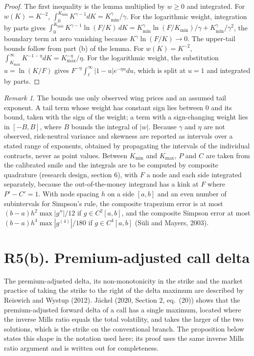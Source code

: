 \documentclass[11pt]{article}
\theoremstyle{remark}
\newtheorem{remark}[proposition]{Remark}
\begin{document}
\begin{proof}
The first inequality is the lemma multiplied by $w\ge0$ and integrated. For $w(K)=K^{-2}$, $\int_0^{K_{\min}}K^{\gamma-1}dK=K_{\min}^\gamma/\gamma$. For the logarithmic weight, integration by parts gives $\int_0^{K_{\min}}K^{\gamma-1}\ln(F/K)\,dK=K_{\min}^\gamma\ln(F/K_{\min})/\gamma+K_{\min}^\gamma/\gamma^2$, the boundary term at zero vanishing because $K^\gamma\ln(F/K)\to0$. The upper-tail bounds follow from part (b) of the lemma. For $w(K)=K^{-2}$, $\int_{K_{\max}}^\infty K^{-1-\eta}dK=K_{\max}^{-\eta}/\eta$. For the logarithmic weight, the substitution $u=\ln(K/F)$ gives $F^{-\eta}\int_\ell^\infty|1-u|e^{-\eta u}du$, which is split at $u=1$ and integrated by parts.
\end{proof}

\begin{remark}
The bounds use only observed wing prices and an assumed tail exponent. A tail term whose weight has constant sign lies between $0$ and its bound, taken with the sign of the weight; a term with a sign-changing weight lies in $[-B,B]$, where $B$ bounds the integral of $|w|$. Because $\gamma$ and $\eta$ are not observed, risk-neutral variance and skewness are reported as intervals over a stated range of exponents, obtained by propagating the intervals of the individual contracts, never as point values. Between $K_{\min}$ and $K_{\max}$, $P$ and $C$ are taken from the calibrated smile and the integrals are to be computed by composite quadrature (research design, section 6), with $F$ a node and each side integrated separately, because the out-of-the-money integrand has a kink at $F$ where $P'-C'=1$. With node spacing $h$ on a side $[a,b]$ and an even number of subintervals for Simpson's rule, the composite trapezium error is at most $(b-a)h^2\max|g''|/12$ if $g\in C^2[a,b]$, and the composite Simpson error at most $(b-a)h^4\max|g^{(4)}|/180$ if $g\in C^4[a,b]$ (S\"uli and Mayers, 2003).
\end{remark}

\section*{R5(b). Premium-adjusted call delta}

The premium-adjusted delta, its non-monotonicity in the strike and the market practice of taking the strike to the right of the delta maximum are described by Reiswich and Wystup (2012). J\"ackel (2020, Section 2, eq.~(20)) shows that the premium-adjusted forward delta of a call has a single maximum, located where the inverse Mills ratio equals the total volatility, and takes the larger of the two solutions, which is the strike on the conventional branch. The proposition below states this shape in the notation used here; its proof uses the same inverse Mills ratio argument and is written out for completeness.
\end{document}

